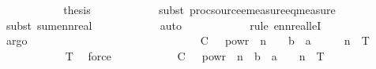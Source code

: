 \begin{isabellebody}
\ \ \ \ \ \ \ \ \isamarkupfalse%
\ \isamarkupfalse%
\ {\isacharquery}{\kern0pt}thesis\isanewline
\ \ \ \ \ \ \ \ \ \ \isamarkupfalse%
\ {\isacharparenleft}{\kern0pt}subst\ proc{\isacharunderscore}{\kern0pt}source{\isachardot}{\kern0pt}emeasure{\isacharunderscore}{\kern0pt}eq{\isacharunderscore}{\kern0pt}measure{\isacharparenright}{\kern0pt}\isanewline
\ \ \ \ \ \ \ \ \ \ \isamarkupfalse%
\ {\isacharparenleft}{\kern0pt}subst\ sum{\isacharunderscore}{\kern0pt}ennreal{\isacharparenright}{\kern0pt}\isanewline
\ \ \ \ \ \ \ \ \ \ \isamarkupfalse%
\ auto\isanewline
\ \ \ \ \ \ \ \ \ \ \isamarkupfalse%
\ {\isacharparenleft}{\kern0pt}rule\ ennreal{\isacharunderscore}{\kern0pt}leI{\isacharparenright}{\kern0pt}\isanewline
\ \ \ \ \ \ \ \ \ \ \isamarkupfalse%
\ argo\isanewline
\ \ \ \ \ \ \ \ \ \ \isamarkupfalse%
\isanewline
\ \ \ \ \ \ \ \ \isamarkupfalse%
\isanewline
\ \ \ \ \ \ \isamarkupfalse%
\ \isamarkupfalse%
\ {\isachardoublequoteopen}{\isachardot}{\kern0pt}{\isachardot}{\kern0pt}{\isachardot}{\kern0pt}\ {\isasymle}\ C\ {\isacharasterisk}{\kern0pt}\ {}\ powr\ {\isacharparenleft}{\kern0pt}{\isacharminus}{\kern0pt}\ n\ {\isacharasterisk}{\kern0pt}\ {\isacharparenleft}{\kern0pt}{}\ {\isacharplus}{\kern0pt}\ b\ {\isacharminus}{\kern0pt}\ a\ {\isacharasterisk}{\kern0pt}\ {\isasymgamma}{\isacharparenright}{\kern0pt}{\isacharparenright}{\kern0pt}\ {\isacharasterisk}{\kern0pt}\ {\isasymlfloor}{}\ {\isacharcircum}{\kern0pt}\ n\ {\isacharasterisk}{\kern0pt}\ T{\isasymrfloor}{\isachardoublequoteclose}\isanewline
\ \ \ \ \ \ \ \ \isamarkupfalse%
\ {\isacartoucheopen}{}\ {\isacharless}{\kern0pt}\ T{\isacartoucheclose}\ \isamarkupfalse%
\ force\isanewline
\ \ \ \ \ \ \isamarkupfalse%
\ \isamarkupfalse%
\ {\isachardoublequoteopen}{\isachardot}{\kern0pt}{\isachardot}{\kern0pt}{\isachardot}{\kern0pt}\ {\isasymle}\ C\ {\isacharasterisk}{\kern0pt}\ {}\ powr\ {\isacharparenleft}{\kern0pt}{\isacharminus}{\kern0pt}\ n\ {\isacharasterisk}{\kern0pt}\ {\isacharparenleft}{\kern0pt}{}{\isacharplus}{\kern0pt}b\ {\isacharminus}{\kern0pt}\ a\ {\isacharasterisk}{\kern0pt}\ {\isasymgamma}{\isacharparenright}{\kern0pt}{\isacharparenright}{\kern0pt}\ {\isacharasterisk}{\kern0pt}\ {}{\isacharcircum}{\kern0pt}n\ {\isacharasterisk}{\kern0pt}\ T{\isachardoublequoteclose}\isanewline

\end{isabellebody}
